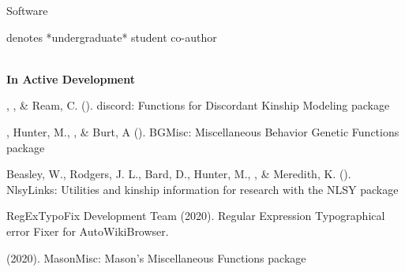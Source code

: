 \begin{rSection}{\textrm{Software}}%
\vspace{-1mm}\begin{center}\footnotesize{denotes *undergraduate* student co-author}\end{center}\vspace{-5mm}\\
{\large \textbf{In Active Development}}
\begin{etaremune}
\item\meb, \jt, \& Ream, C. (\the\year). discord: Functions for Discordant Kinship Modeling \R package 
%
\item\meb, Hunter, M., \jt, \& Burt, A (\the\year). BGMisc: Miscellaneous Behavior Genetic Functions \R package %
%
%
\item  Beasley, W., Rodgers, J. L., Bard, D., Hunter, M., \meb, \& Meredith, K. (\the\year). NlsyLinks: Utilities and kinship information for research with the NLSY \R package \smallskip\\
%

\item RegExTypoFix Development Team (2020). Regular Expression Typographical error Fixer for AutoWikiBrowser. 
%
\item\meb (2020). MasonMisc: Mason's Miscellaneous Functions \R package 
%
%
\end{etaremune}
\end{rSection}